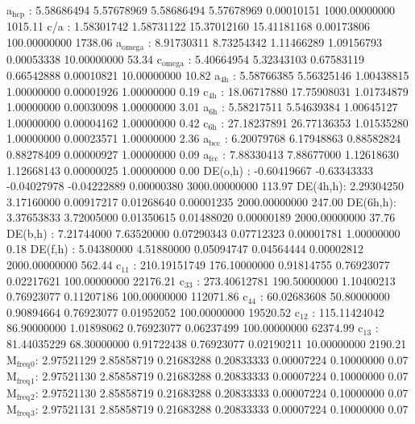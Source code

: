 \documentclass[11pt]{article}
\begin{document}
a\(_{\text{hcp}}\)   :   5.58686494   5.57678969   5.58686494   5.57678969   0.00010151 1000.00000000      1015.11
c/a     :   1.58301742   1.58731122  15.37012160  15.41181168   0.00173806 100.00000000      1738.06
a\(_{\text{omega}}\) :   8.91730311   8.73254342   1.11466289   1.09156793   0.00053338  10.00000000        53.34
c\(_{\text{omega}}\) :   5.40664954   5.32343103   0.67583119   0.66542888   0.00010821  10.00000000        10.82
a\(_{\text{4h}}\)    :   5.58766385   5.56325146   1.00438815   1.00000000   0.00001926   1.00000000         0.19
c\(_{\text{4h}}\)    :  18.06717880  17.75908031   1.01734879   1.00000000   0.00030098   1.00000000         3.01
a\(_{\text{6h}}\)    :   5.58217511   5.54639384   1.00645127   1.00000000   0.00004162   1.00000000         0.42
c\(_{\text{6h}}\)    :  27.18237891  26.77136353   1.01535280   1.00000000   0.00023571   1.00000000         2.36
a\(_{\text{bcc}}\)   :   6.20079768   6.17948863   0.88582824   0.88278409   0.00000927   1.00000000         0.09
a\(_{\text{fcc}}\)   :   7.88330413   7.88677000   1.12618630   1.12668143   0.00000025   1.00000000         0.00
DE(o,h) :  -0.60419667  -0.63343333  -0.04027978  -0.04222889   0.00000380 3000.00000000       113.97
DE(4h,h):   2.29304250   3.17160000   0.00917217   0.01268640   0.00001235 2000.00000000       247.00
DE(6h,h):   3.37653833   3.72005000   0.01350615   0.01488020   0.00000189 2000.00000000        37.76
DE(b,h) :   7.21744000   7.63520000   0.07290343   0.07712323   0.00001781   1.00000000         0.18
DE(f,h) :   5.04380000   4.51880000   0.05094747   0.04564444   0.00002812 2000.00000000       562.44
c\(_{\text{11}}\)    : 210.19151749 176.10000000   0.91814755   0.76923077   0.02217621 100.00000000     22176.21
c\(_{\text{33}}\)    : 273.40612781 190.50000000   1.10400213   0.76923077   0.11207186 100.00000000    112071.86
c\(_{\text{44}}\)    :  60.02683608  50.80000000   0.90894664   0.76923077   0.01952052 100.00000000     19520.52
c\(_{\text{12}}\)    : 115.11424042  86.90000000   1.01898062   0.76923077   0.06237499 100.00000000     62374.99
c\(_{\text{13}}\)    :  81.44035229  68.30000000   0.91722438   0.76923077   0.02190211  10.00000000      2190.21
M\(_{\text{freq}}\)\(_{\text{0}}\):   2.97521129   2.85858719   0.21683288   0.20833333   0.00007224   0.10000000         0.07
M\(_{\text{freq}}\)\(_{\text{1}}\):   2.97521130   2.85858719   0.21683288   0.20833333   0.00007224   0.10000000         0.07
M\(_{\text{freq}}\)\(_{\text{2}}\):   2.97521130   2.85858719   0.21683288   0.20833333   0.00007224   0.10000000         0.07
M\(_{\text{freq}}\)\(_{\text{3}}\):   2.97521131   2.85858719   0.21683288   0.20833333   0.00007224   0.10000000         0.07
\end{document}
